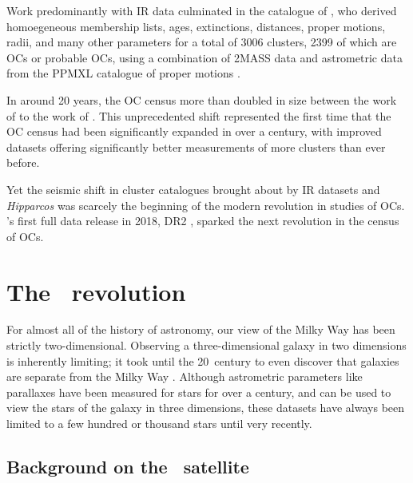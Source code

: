 Work predominantly with IR data culminated in the catalogue of \cite{kharchenko_global_2013}, who derived homoegeneous membership lists, ages, extinctions, distances, proper motions, radii, and many other parameters for a total of 3006 clusters, 2399 of which are OCs or probable OCs, using a combination of 2MASS data and astrometric data from the PPMXL catalogue of proper motions \citep{roeser_ppmxl_catalog_2010}.

In around 20 years, the OC census more than doubled in size between the work of \cite{mermilliod_database_1995} to the work of \cite{kharchenko_global_2013}. This unprecedented shift represented the first time that the OC census had been significantly expanded in over a century, with improved datasets offering significantly better measurements of more clusters than ever before. 

Yet the seismic shift in cluster catalogues brought about by IR datasets and \emph{Hipparcos} was scarcely the beginning of the modern revolution in studies of OCs. \gaia's first full data release in 2018, DR2 \citep{brown_gaia_2018}, sparked the next revolution in the census of OCs.


\section{The \gaia\ revolution}
\label{sec:intro:gaia}

For almost all of the history of astronomy, our view of the Milky Way has been strictly two-dimensional. Observing a three-dimensional galaxy in two dimensions is inherently limiting; it took until the 20\third\ century to even discover that galaxies are separate from the Milky Way \citep{curtis_novae_spiral_1917}. Although astrometric parameters like parallaxes have been measured for stars for over a century, and can be used to view the stars of the galaxy in three dimensions, these datasets have always been limited to a few hundred or thousand stars until very recently. %


\subsection{Background on the \gaia\ satellite}
\label{sec:intro:history:gaia:background}

